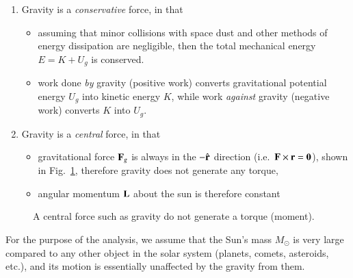 \documentclass{../../../oss-handout}
\newcommand{\mb}[1]{\ensuremath\mathbf{#1}}
\begin{document}
\begin{enumerate}[leftmargin=18pt,topsep=0pt]
\item Gravity is a \emph{conservative} force, in that
  \begin{itemize}[leftmargin=15pt,noitemsep,topsep=0pt]
  \item assuming that minor collisions with space dust and other methods of
    energy dissipation are negligible, then the total mechanical energy
    $E=K+U_g$ is conserved.
  \item work done \emph{by} gravity (positive work) converts gravitational
    potential energy $U_g$ into kinetic energy $K$, while work \emph{against}
    gravity (negative work) converts $K$ into $U_g$.
  \end{itemize}
\item Gravity is a \emph{central} force, in that
  \begin{itemize}[leftmargin=15pt,noitemsep,topsep=0pt]
  \item gravitational force $\mb{F}_g$ is always in the $-\hat{\mb{r}}$
    direction (i.e.\ $\mb{F}\times\mb{r}=\mb{0}$), shown in
    Fig.~\ref{central-force}, therefore gravity does not generate any torque,
  \item angular momentum $\mb{L}$ about the sun is therefore constant
  \end{itemize}
\end{enumerate}
\begin{figure}[!ht]
  \centering
  \caption{A central force such as gravity do not generate a torque (moment).}
  \label{central-force}
\end{figure}
For the purpose of the analysis, we assume that the Sun's mass $M_\odot$
is very large compared to any other object in the solar system (planets,
comets, asteroids, etc.), and its motion is essentially unaffected by the
gravity from them.
\end{document}
